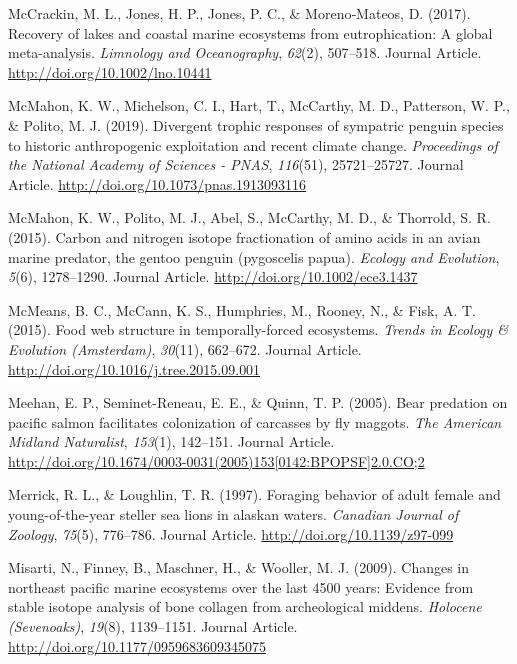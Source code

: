 \documentclass [11pt, proquest] {uwthesis}[2015/03/03]
\begin{document}
\hypertarget{ref-McCrackin2017}{}
McCrackin, M. L., Jones, H. P., Jones, P. C., \& Moreno‐Mateos, D.
(2017). Recovery of lakes and coastal marine ecosystems from
eutrophication: A global meta-analysis. \emph{Limnology and
Oceanography}, \emph{62}(2), 507--518. Journal Article.
\url{http://doi.org/10.1002/lno.10441}

\hypertarget{ref-McMahon2019}{}
McMahon, K. W., Michelson, C. I., Hart, T., McCarthy, M. D., Patterson,
W. P., \& Polito, M. J. (2019). Divergent trophic responses of sympatric
penguin species to historic anthropogenic exploitation and recent
climate change. \emph{Proceedings of the National Academy of Sciences -
PNAS}, \emph{116}(51), 25721--25727. Journal Article.
\url{http://doi.org/10.1073/pnas.1913093116}

\hypertarget{ref-McMahon2015}{}
McMahon, K. W., Polito, M. J., Abel, S., McCarthy, M. D., \& Thorrold,
S. R. (2015). Carbon and nitrogen isotope fractionation of amino acids
in an avian marine predator, the gentoo penguin (pygoscelis papua).
\emph{Ecology and Evolution}, \emph{5}(6), 1278--1290. Journal Article.
\url{http://doi.org/10.1002/ece3.1437}

\hypertarget{ref-McMeans2015}{}
McMeans, B. C., McCann, K. S., Humphries, M., Rooney, N., \& Fisk, A. T.
(2015). Food web structure in temporally-forced ecosystems. \emph{Trends
in Ecology \& Evolution (Amsterdam)}, \emph{30}(11), 662--672. Journal
Article. \url{http://doi.org/10.1016/j.tree.2015.09.001}

\hypertarget{ref-Meehan2005}{}
Meehan, E. P., Seminet-Reneau, E. E., \& Quinn, T. P. (2005). Bear
predation on pacific salmon facilitates colonization of carcasses by fly
maggots. \emph{The American Midland Naturalist}, \emph{153}(1),
142--151. Journal Article.
\href{http://doi.org/10.1674/0003-0031(2005)153\%5B0142:BPOPSF\%5D2.0.CO;2}{http://doi.org/10.1674/0003-0031(2005)153{[}0142:BPOPSF{]}2.0.CO;2}

\hypertarget{ref-Merrick1997}{}
Merrick, R. L., \& Loughlin, T. R. (1997). Foraging behavior of adult
female and young-of-the-year steller sea lions in alaskan waters.
\emph{Canadian Journal of Zoology}, \emph{75}(5), 776--786. Journal
Article. \url{http://doi.org/10.1139/z97-099}

\hypertarget{ref-Misarti2009}{}
Misarti, N., Finney, B., Maschner, H., \& Wooller, M. J. (2009). Changes
in northeast pacific marine ecosystems over the last 4500 years:
Evidence from stable isotope analysis of bone collagen from
archeological middens. \emph{Holocene (Sevenoaks)}, \emph{19}(8),
1139--1151. Journal Article.
\url{http://doi.org/10.1177/0959683609345075}
\end{document}
